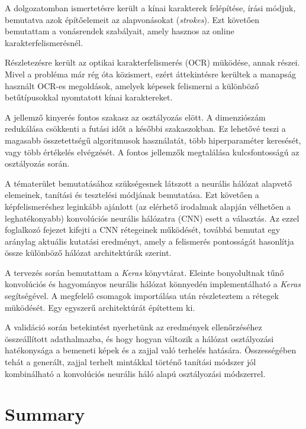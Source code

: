
A dolgozatomban ismertetésre került a kínai karakterek felépítése, írási módjuk, bemutatva azok építőelemeit az alapvonásokat (\textit{strokes}). Ezt követően bemutattam a vonásrendek szabályait, amely hasznos az online karakterfelismerésnél.

Részletezésre került az optikai karakterfelismerés (OCR) müködése, annak részei. Mivel a probléma már rég óta közismert, ezért áttekintésre kerültek a manapság használt OCR-es megoldások, amelyek képesek felismerni a különböző betűtípusokkal nyomtatott kínai karaktereket.

A jellemző kinyerés fontos szakasz az osztályozás elött. A dimenziószám redukálása csökkenti a futási időt a későbbi szakaszokban. Ez lehetővé teszi a magasabb összetettségű algoritmusok használatát, több hiperparaméter keresését, vagy több értékelés elvégzését. A fontos jellemzők megtalálása kulcsfontosságú az osztályozás során.

A tématerület bemutatásához szükségesnek látszott a neurális hálózat alapvető elemeinek, tanítási és tesztelési módjának bemutatása. Ezt követően a képfelismeréshez leginkább ajánlott (az elérhető irodalmak alapján vélhetően a leghatékonyabb) konvolúciós neurális hálózatra (CNN) esett a választás. Az ezzel foglalkozó fejezet kifejti a CNN rétegeinek működését, továbbá bemutat egy aránylag aktuális kutatási eredményt, amely a felismerés pontosságát hasonlítja össze különböző hálózat architektúrák szerint.

A tervezés során bemutattam a \textit{Keras} könyvtárat. Eleinte bonyolultnak tűnő konvolúciós és hagyományos neurális hálózat könnyedén implementálható a \textit{Keras} segítségével. A megfelelő csomagok importálása után részleteztem a rétegek müködését. Egy egyszerű architektúrát építettem ki.

A validáció során betekintést nyerhetünk az eredmények ellenőrzéséhez összeállított adathalmazba, és hogy hogyan változik a hálózat osztályozási hatékonysága a bemeneti képek és a zajjal való terhelés hatására. Összességében tehát a generált, zajjal terhelt mintákkal történő tanítási módszer jól kombinálható a konvolúciós neurális háló alapú osztályozási módszerrel.

\pagebreak

\section*{Summary}

